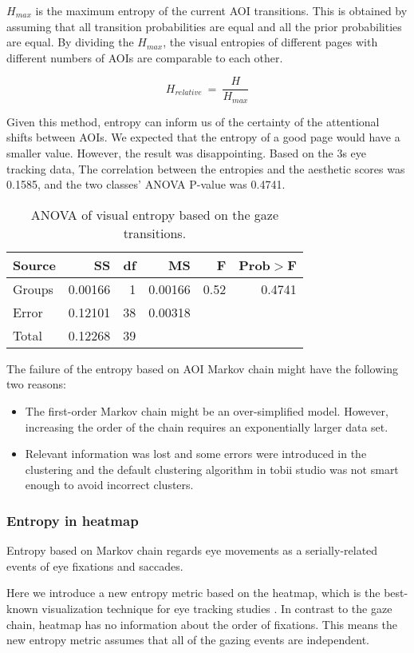 $H_{max}$ is the maximum entropy of the current AOI transitions. This is obtained by assuming that all transition probabilities are equal and all the prior probabilities are equal.
By dividing the $H_{max}$, the visual entropies of different pages with different numbers of AOIs are comparable to each other.

$$H_{relative}~=~\frac{H}{H_{max}}$$

Given this method, entropy can inform us of the certainty of the attentional shifts between AOIs. We expected that the entropy of a good page would have a smaller value. However, the result was disappointing. Based on the 3s eye tracking data, The correlation between the entropies and the aesthetic scores was 0.1585, and the two classes' ANOVA P-value was 0.4741.

\begin{table}[H]
\centering
\begin{tabular}{lrrrrr}
  Source&SS&df&MS&F&Prob$>$F\\ \hline
  Groups&0.00166&1&0.00166&0.52&0.4741\\
  Error&0.12101&38&0.00318&&\\
  Total&0.12268&39&&&\\
\end{tabular}
\caption{ANOVA of visual entropy based on the gaze transitions.}
\label{tab:ANOVA-ve}
\end{table}

The failure of the entropy based on AOI Markov chain might have the following two reasons:
\begin{itemize}
  \item The first-order Markov chain might be an over-simplified model. However, increasing the order of the chain requires an exponentially larger data set.
  \item Relevant information was lost and some errors were introduced in the clustering and the default clustering algorithm in tobii studio was not smart enough to avoid incorrect clusters.
\end{itemize}

\subsubsection{Entropy in heatmap}
Entropy based on Markov chain regards eye movements as a serially-related events of eye fixations and saccades.

Here we introduce a new entropy metric based on the heatmap, which is the best-known visualization technique for eye tracking studies \citep{Nielsen2010}. In contrast to the gaze chain, heatmap has no information about the order of fixations. This means the new entropy metric assumes that all of the gazing events are independent.

